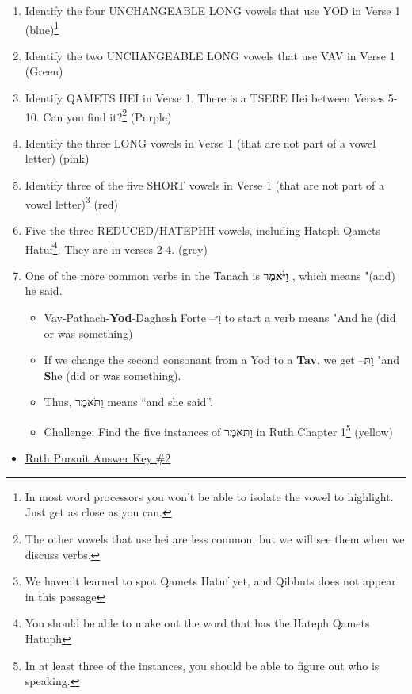 \documentclass[
]{turabian-researchpaper}
\providecommand{\tightlist}{%
  \setlength{\itemsep}{0pt}\setlength{\parskip}{0pt}}
\begin{document}
\begin{itemize}
\begin{itemize}
    \begin{enumerate}
    \def\labelenumi{\arabic{enumi}.}
    \tightlist
    \item
      Identify the four UNCHANGEABLE LONG vowels that use YOD in Verse 1 (blue)\footnote{In most word processors you won't be able to isolate the vowel to highlight. Just get as close as you can.}\textbar{}
    \item
      Identify the two UNCHANGEABLE LONG vowels that use VAV in Verse 1 (Green)
    \item
      Identify QAMETS HEI in Verse 1. There is a TSERE Hei between Verses 5-10. Can you find it?\footnote{The other vowels that use hei are less common, but we will see them when we discuss verbs.} (Purple)
    \item
      Identify the three LONG vowels in Verse 1 (that are not part of a vowel letter) (pink)\textbar{}
    \item
      Identify three of the five SHORT vowels in Verse 1 (that are not part of a vowel letter)\footnote{We haven't learned to spot Qamets Hatuf yet, and Qibbuts does not appear in this passage} (red)
    \item
      Five the three REDUCED/HATEPHH vowels, including Hateph Qamets Hatuf\footnote{You should be able to make out the word that has the Hateph Qamets Hatuph}. They are in verses 2-4. (grey)
    \item
      One of the more common verbs in the Tanach is \textbf{וַיֹּאמֶר }, which means "(and) he said.

      \begin{itemize}
      \tightlist
      \item
        Vav-Pathach-\textbf{Yod}-Daghesh Forte --וַיּ to start a verb means "And he (did or was something)\\
      \item
        If we change the second consonant from a Yod to a \textbf{Tav}, we get --וָתּ "and \textbf{S}he (did or was something).\\
      \item
        Thus, וַתֹּאמֶר means ``and she said''.\\
      \item
        Challenge: Find the five instances of וַתֹּאמֶר in Ruth Chapter 1\footnote{In at least three of the instances, you should be able to figure out who is speaking.} (yellow)\\
      \end{itemize}
    \end{enumerate}

    \begin{itemize}
    \tightlist
    \item
      \href{https://drive.google.com/file/d/1xtcXRb1PWbt-qkbVWW9yGfkC40_d8gtf/view?usp=sharing}{Ruth Pursuit Answer Key \#2}
    \end{itemize}
  \end{itemize}
\end{itemize}
\end{document}
